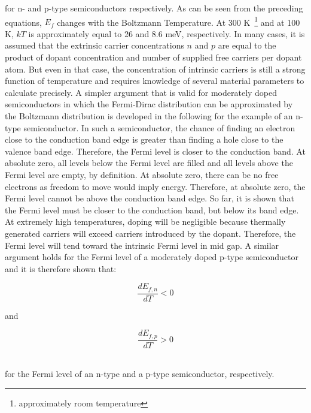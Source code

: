 for n- and p-type semiconductors respectively. As can be seen from the preceding equations, $E_{f}$ changes with the Boltzmann Temperature. At 300 K~\footnote{approximately room temperature} and at 100 K, $kT$ is approximately equal to 26 and 8.6 meV, respectively. In many cases, it is assumed that the extrinsic carrier concentrations $n$ and $p$ are equal to the product of dopant concentration and number of supplied free carriers per dopant atom. But even in that case, the concentration of intrinsic carriers is still a strong function of temperature and requires knowledge of several material parameters to calculate precisely. A simpler argument that is valid for moderately doped semiconductors in which the Fermi-Dirac distribution can be approximated by the Boltzmann distribution is developed in the following for the example of an n-type semiconductor. In such a semiconductor, the chance of finding an electron close to the conduction band edge is greater than finding a hole close to the valence band edge. Therefore, the Fermi level is closer to the conduction band. At absolute zero, all levels below the Fermi level are filled and all levels above the Fermi level are empty, by definition. At absolute zero, there can be no free electrons as freedom to move would imply energy. Therefore, at absolute zero, the Fermi level cannot be above the conduction band edge. So far, it is shown that the Fermi level must be closer to the conduction band, but below its band edge. At extremely high temperatures, doping will be negligible because thermally generated carriers will exceed carriers introduced by the dopant. Therefore, the Fermi level will tend toward the intrinsic Fermi level in mid gap. A similar argument holds for the Fermi level of a moderately doped p-type semiconductor and it is therefore shown that:\\[5pt]
\begin{minipage}[c]{0.4\textwidth}
	\begin{equation}
	\frac{dE_{f,n}}{dT} < 0
	\end{equation}
\end{minipage}	
\hfill
and
\hfill
\begin{minipage}[c]{0.4\textwidth}
	\begin{equation}
	\frac{dE_{f,p}}{dT} > 0
	\end{equation}
\end{minipage}\\[10pt]
for the Fermi level of an n-type and a p-type semiconductor, respectively.
